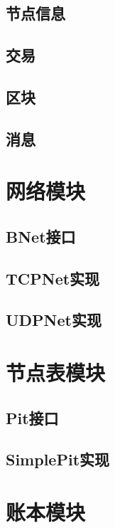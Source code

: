 \subsection{节点信息}

\subsection{交易}

\subsection{区块}

\subsection{消息}

\section{网络模块}

\subsection{BNet接口}

\subsection{TCPNet实现}

\subsection{UDPNet实现}

\section{节点表模块}

\subsection{Pit接口}

\subsection{SimplePit实现}

\section{账本模块}


